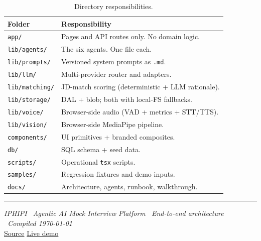 \documentclass[11pt,a4paper]{article}
\begin{document}
\begin{table}[h]
\centering
\renewcommand{\arraystretch}{1.25}
\begin{tabular}{@{}p{3.6cm} p{11.0cm}@{}}
\toprule
\textbf{Folder} & \textbf{Responsibility} \\
\midrule
\texttt{app/}              & Pages and API routes only. No domain logic. \\
\texttt{lib/agents/}       & The six agents. One file each. \\
\texttt{lib/prompts/}      & Versioned system prompts as \texttt{.md}. \\
\texttt{lib/llm/}          & Multi-provider router and adapters. \\
\texttt{lib/matching/}     & JD-match scoring (deterministic + LLM rationale). \\
\texttt{lib/storage/}      & DAL + blob; both with local-FS fallbacks. \\
\texttt{lib/voice/}        & Browser-side audio (VAD + metrics + STT/TTS). \\
\texttt{lib/vision/}       & Browser-side MediaPipe pipeline. \\
\texttt{components/}       & UI primitives + branded composites. \\
\texttt{db/}               & SQL schema + seed data. \\
\texttt{scripts/}          & Operational \texttt{tsx} scripts. \\
\texttt{samples/}          & Regression fixtures and demo inputs. \\
\texttt{docs/}             & Architecture, agents, runbook, walkthrough. \\
\bottomrule
\end{tabular}
\caption{Directory responsibilities.}
\end{table}

\vspace{1.5cm}
\hrule
\vspace{0.4cm}
\begin{center}
\textit{IPHIPI \textbullet\ Agentic AI Mock Interview Platform \textbullet\
End-to-end architecture \textbullet\ Compiled \today}\\[2pt]
\href{https://github.com/roshan5619/Intelligent_Mock_Interview_Agent}{Source}
\quad\textbullet\quad
\href{https://iphpi-hackthon.vercel.app}{Live demo}
\end{center}
\end{document}
